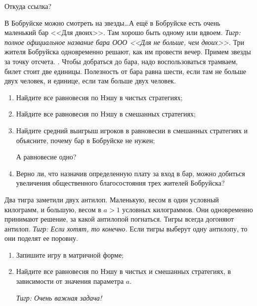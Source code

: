 \begin{problem}
\begin{source}
\cite[4.15]{gintis:gte} {\red  Откуда ссылка?}
\end{source}
В Бобруйске можно смотреть на звезды\ldots А ещё в Бобруйске есть очень маленький бар <<Для двоих>>. Там хорошо быть одному или вдвоем{\it. Тигр: полное официальное название бара ООО <<Для не больше, чем двоих>>.} Три жителя Бобруйска одновременно решают, как им провести вечер. Примем звезды за точку отсчета. {}. Чтобы добраться до бара, надо воспользоваться трамваем, билет стоит две единицы. Полезность от бара равна шести, если там не больше двух человек, и единице, если там больше двух человек.\par
\begin{enumerate}
\item  Найдите все равновесия по Нэшу в чистых стратегиях;\par
\item Найдите все равновесия по Нэшу в смешанных стратегиях;\par
\item  Найдите средний выигрыш игроков в равновесии в смешанных стратегиях и объясните, почему бар в Бобруйске не нужен;\par {\red А равновесие одно?}
\item Верно ли, что назначив определенную плату за вход в бар, можно добиться увеличения общественного благосостояния трех жителей Бобруйска?
\end{enumerate}


\begin{sol}

\end{sol}
\end{problem}






\begin{problem}
Два тигра заметили двух антилоп. Маленькую, весом в один условный килограмм, и большую, весом в  $a>1$  условных килограммов. Они одновременно принимают решение, за какой антилопой погнаться. Тигры всегда догоняют антилоп. {\it Тигр: Если хотят, то конечно.} Если тигры выберут одну антилопу, то они поделят ее поровну.\par
\begin{enumerate}
\item Запишите игру в матричной форме;\par
\item Найдите все равновесия по Нэшу в чистых и смешанных стратегиях, в зависимости от значения параметра $a$.\par
{\it Тигр: Очень важная задача!}\par
\end{enumerate}


\begin{sol}

\end{sol}
\end{problem}

